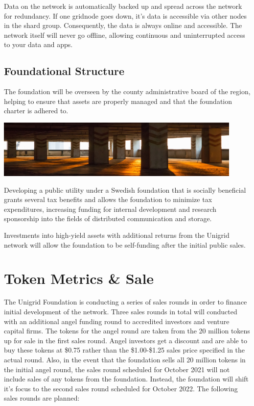 \documentclass{article}
\begin{document}
Data on the network is automatically backed up and spread across the network for redundancy. If one gridnode goes down, it's data is accessible via other nodes in the shard group. Consequently, the data is always online and accessible. The network itself will never go offline, allowing continuous and uninterrupted access to your data and apps.

\subsection{Foundational Structure}
The foundation will be overseen by the county administrative board of the region, helping to ensure that assets are properly managed and that the foundation charter is adhered to.


\begin{mdframed}[style=textimage]
	\includegraphics[width=345pt]{foundation}
\end{mdframed}

\noindent Developing a public utility under a Swedish foundation that is socially beneficial grants several tax benefits and allows the foundation to minimize tax expenditures, increasing funding for internal development and research sponsorship into the fields of distributed communication and storage.

\noindent Investments into high-yield assets with additional returns from the Unigrid network will allow the foundation to be self-funding after the initial public sales.

\section{Token Metrics \& Sale}
The Unigrid Foundation is conducting a series of sales rounds in order to finance initial development of the network. Three sales rounds in total will conducted with an additional angel funding round to accredited investors and venture capital firms. The tokens for the angel round are taken from the 20 million tokens up for sale in the first sales round. Angel investors get a discount and are able to buy these tokens at \$0.75 rather than the \$1.00-\$1.25 sales price specified in the actual round. Also, in the event that the foundation sells all 20 million tokens in the initial angel round, the sales round scheduled for October 2021 will not include sales of any tokens from the foundation. Instead, the foundation will shift it's focus to the second sales round scheduled for October 2022. The following sales rounds are planned:
\end{document}
